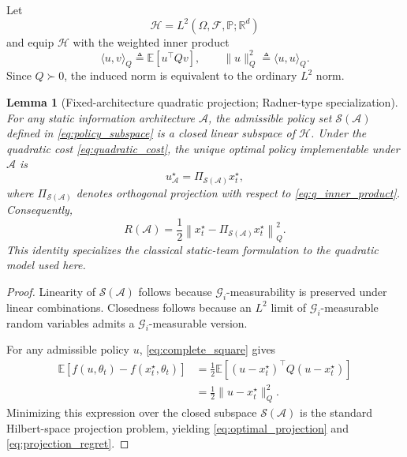 \documentclass[11pt]{article}
\newtheorem{lemma}{Lemma}
\begin{document}
Let
\begin{equation}
    \mathcal{H}
    =
    L^2(
        \Omega,\mathcal{F},\mathbb{P};
        \mathbb{R}^{d}
    )
    \label{eq:hilbert_space}
\end{equation}
and equip $\mathcal{H}$ with the weighted inner product
\begin{equation}
    \langle u,v\rangle_Q
    \triangleq
    \mathbb{E}
    \left[
        u^\top Qv
    \right],
    \qquad
    \|u\|_Q^2
    \triangleq
    \langle u,u\rangle_Q.
    \label{eq:q_inner_product}
\end{equation}
Since $Q\succ0$, the induced norm is equivalent to the ordinary $L^2$ norm.

\begin{lemma}[Fixed-architecture quadratic projection; Radner-type specialization]
\label{lem:radner_projection}
For any static information architecture $\mathcal{A}$, the admissible policy set
$\mathcal{S}(\mathcal{A})$ defined in \eqref{eq:policy_subspace} is a closed
linear subspace of $\mathcal{H}$. Under the quadratic cost
\eqref{eq:quadratic_cost}, the unique optimal policy implementable under
$\mathcal{A}$ is
\begin{equation}
    u_{\mathcal{A}}^\star
    =
    \Pi_{\mathcal{S}(\mathcal{A})}
    x_t^\star,
    \label{eq:optimal_projection}
\end{equation}
where $\Pi_{\mathcal{S}(\mathcal{A})}$ denotes orthogonal projection with
respect to \eqref{eq:q_inner_product}. Consequently,
\begin{equation}
    \boxed{
    R(\mathcal{A})
    =
    \frac{1}{2}
    \left\|
        x_t^\star
        -
        \Pi_{\mathcal{S}(\mathcal{A})}
        x_t^\star
    \right\|_Q^2 .
    }
    \label{eq:projection_regret}
\end{equation}
This identity specializes the classical static-team formulation
\cite{radner1962team} to the quadratic model used here.
\end{lemma}

\begin{proof}
Linearity of $\mathcal{S}(\mathcal{A})$ follows because
$\mathcal{G}_i$-measurability is preserved under linear combinations.
Closedness follows because an $L^2$ limit of
$\mathcal{G}_i$-measurable random variables admits a
$\mathcal{G}_i$-measurable version.

For any admissible policy $u$, \eqref{eq:complete_square} gives
\begin{align}
    \mathbb{E}
    \left[
        f(u,\theta_t)
        -
        f(x_t^\star,\theta_t)
    \right]
    &=
    \frac{1}{2}
    \mathbb{E}
    \left[
        (u-x_t^\star)^\top
        Q
        (u-x_t^\star)
    \right]
    \nonumber\\
    &=
    \frac{1}{2}
    \|u-x_t^\star\|_Q^2.
    \label{eq:projection_proof}
\end{align}
Minimizing this expression over the closed subspace
$\mathcal{S}(\mathcal{A})$ is the standard Hilbert-space projection problem,
yielding \eqref{eq:optimal_projection} and \eqref{eq:projection_regret}.
\end{proof}
\end{document}
